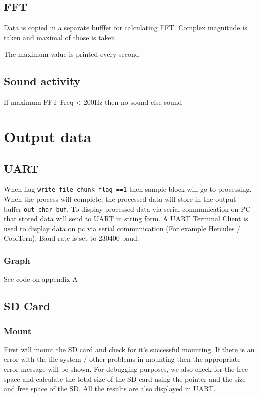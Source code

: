 \documentclass[11pt]{article}
\begin{document}
\subsection{FFT}
\label{sec:org33bc954}

Data is copied in a separate bufffer for calculating FFT. Complex magnitude is taken and maximal of those is taken

The maximum value is printed every second

\subsection{Sound activity}
\label{sec:org0ff945c}

If maximum FFT Freq < 200Hz then no sound else sound


\section{Output data}
\label{sec:org88c9124}

\subsection{UART}
\label{sec:org0468f83}

When flag \texttt{write\_file\_chunk\_flag ==1} then sample block will go to processing. When the process will complete, the processed data will store in the output buffer \texttt{out\_char\_buf}. To display processed data via serial communication on PC that stored data will send to UART in string form. A UART Terminal Client is used to display data on pc via serial communication (For example Hercules / CoolTern). Baud rate is set to 230400 baud.

\subsubsection*{Graph}
\label{sec:org1e8b54f}
See code on appendix A

\subsection{SD Card}
\label{sec:org03ff77c}


\subsubsection*{Mount}
\label{sec:orge3faf3d}
First will mount the SD card and check for it's successful mounting. If there is an error with the file system / other problems in mounting then the appropriate error message will be shown. For debugging purposes, we also check for the free space and calculate the total size of the SD card using the pointer and the size and free space of the SD. All the results are also displayed in UART.
\end{document}
